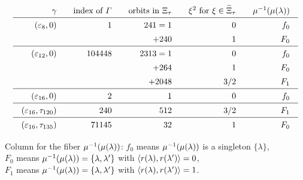 \documentclass{amsart} %
\begin{document}
\begin{table}
\[
\setlength{\arraycolsep}{10pt}
\renewcommand{\arraystretch}{1.4}
\begin{array}{rrrrr}
\gamma &\textrm{index of $\vGam$} &\textrm{orbits in $\Xitau$} & \xi^2 \textrm{ for } \xi\in \tilXitau&\mu\inv(\mu(\lambda))\\
\hline 
(\vep_8, 0) &1 & 241= 1 & 0 & f_0 \\
   & & +240 & 1 & F_0 \\
\hline 
(\vep_{12}, 0) &104448 & 2313= 1 & 0 & f_0 \\
   & & +264 & 1 & F_0 \\
   & & +2048 & 3/2 & F_1 \\
 \hline 
(\vep_{16}, 0) &2& 1 & 0 & f_0 \\
\hline 
(\vep_{16}, \tau_{120}) &240& 512 & 3/2 & F_1 \\
\hline 
(\vep_{16}, \tau_{135}) &71145 & 32 & 1 & F_0 \\   
\end{array}
\]
\vskip 3mm
%
\parbox{12cm}{
Column for the fiber $\mu^{-1}(\mu(\lambda))$: 
$f_0$ means $\mu^{-1}(\mu(\lambda))$ is a singleton $\{\lambda\}$,
\\
$ F_0$ means $\mu^{-1}(\mu(\lambda))=\{\lambda, \lambda^{\prime}\}$ with $\langle r(\lambda), r(\lambda^{\prime}) \rangle=0$, 
\\
$ F_1$ means $\mu^{-1}(\mu(\lambda))=\{\lambda, \lambda^{\prime}\}$ with $\langle r(\lambda), r(\lambda^{\prime}) \rangle=1$.
}
%

\vskip 5mm
\caption{Index $[\OG(\Lplus, \PPPplus): \vGam]$ and orbit decomposition of walls}\label{table:Xis}
\end{table}

\end{document}
